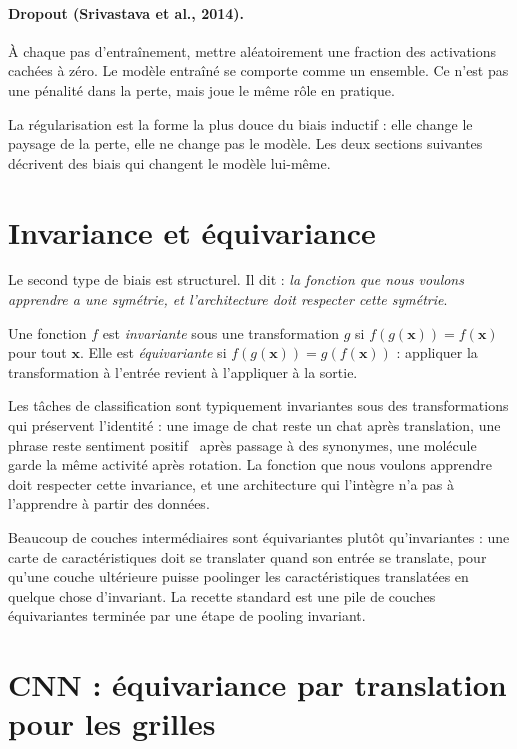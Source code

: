 \paragraph{Dropout (Srivastava et al., 2014).} À chaque pas d'entraînement, mettre aléatoirement une fraction des activations cachées à zéro. Le modèle entraîné se comporte comme un ensemble. Ce n'est pas une pénalité dans la perte, mais joue le même rôle en pratique.

La régularisation est la forme la plus douce du biais inductif : elle change le paysage de la perte, elle ne change pas le modèle. Les deux sections suivantes décrivent des biais qui changent le modèle lui-même.

\section{Invariance et équivariance}

Le second type de biais est structurel. Il dit : \emph{la fonction que nous voulons apprendre a une symétrie, et l'architecture doit respecter cette symétrie}.

\begin{definition}
Une fonction $f$ est \emph{invariante} sous une transformation $g$ si $f(g(\bm{x})) = f(\bm{x})$ pour tout $\bm{x}$. Elle est \emph{équivariante} si $f(g(\bm{x})) = g(f(\bm{x}))$ : appliquer la transformation à l'entrée revient à l'appliquer à la sortie.
\end{definition}

Les tâches de classification sont typiquement invariantes sous des transformations qui préservent l'identité : une image de chat reste un chat après translation, une phrase reste \og sentiment positif \fg\ après passage à des synonymes, une molécule garde la même activité après rotation. La fonction que nous voulons apprendre doit respecter cette invariance, et une architecture qui l'intègre n'a pas à l'apprendre à partir des données.

Beaucoup de couches intermédiaires sont équivariantes plutôt qu'invariantes : une carte de caractéristiques doit se translater quand son entrée se translate, pour qu'une couche ultérieure puisse poolinger les caractéristiques translatées en quelque chose d'invariant. La recette standard est une pile de couches équivariantes terminée par une étape de pooling invariant.

\section{CNN : équivariance par translation pour les grilles}

